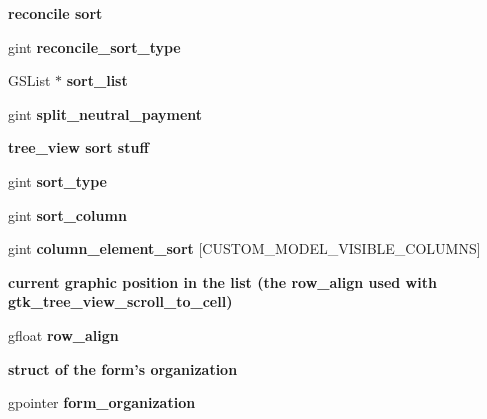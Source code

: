 \begin{Indent}{\bf reconcile sort}\par
{\em \label{_amgrpcebec220ba65776f5a3ed1c3bf399960}
 }\begin{DoxyCompactItemize}
\item 
gint {\bf reconcile\_\-sort\_\-type}
\item 
GSList $\ast$ {\bf sort\_\-list}
\item 
gint {\bf split\_\-neutral\_\-payment}
\end{DoxyCompactItemize}
\end{Indent}
\begin{Indent}{\bf tree\_\-view sort stuff}\par
{\em \label{_amgrpc91bde4d7187ef5e4b0076e78d64c6d4}
 }\begin{DoxyCompactItemize}
\item 
gint {\bf sort\_\-type}
\item 
gint {\bf sort\_\-column}
\item 
gint {\bf column\_\-element\_\-sort} [CUSTOM\_\-MODEL\_\-VISIBLE\_\-COLUMNS]
\end{DoxyCompactItemize}
\end{Indent}
\begin{Indent}{\bf current graphic position in the list (the row\_\-align used with gtk\_\-tree\_\-view\_\-scroll\_\-to\_\-cell)}\par
{\em \label{_amgrp0db122e86c2bad0397dd1a5ce843a338}
 }\begin{DoxyCompactItemize}
\item 
gfloat {\bf row\_\-align}
\end{DoxyCompactItemize}
\end{Indent}
\begin{Indent}{\bf struct of the form's organization}\par
{\em \label{_amgrp48ef37f9f34054fbd28ec989df4f1397}
 }\begin{DoxyCompactItemize}
\item 
gpointer {\bf form\_\-organization}
\end{DoxyCompactItemize}
\end{Indent}
